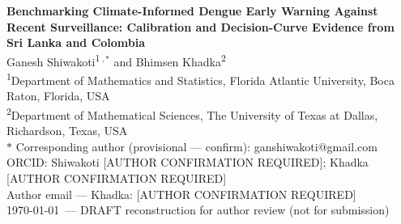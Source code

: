\documentclass[11pt,a4paper]{article}
\begin{document}
\begin{center}
{\Large \textbf{Benchmarking Climate-Informed Dengue Early Warning Against Recent Surveillance: Calibration and Decision-Curve Evidence from Sri Lanka and Colombia}}\\[1.2em]

Ganesh Shiwakoti\textsuperscript{1}\,$^{,\ast}$ and Bhimsen Khadka\textsuperscript{2}\\[0.6em]

\footnotesize
\textsuperscript{1}Department of Mathematics and Statistics, Florida Atlantic University, Boca Raton, Florida, USA\\
\textsuperscript{2}Department of Mathematical Sciences, The University of Texas at Dallas, Richardson, Texas, USA\\[0.4em]
$\ast$ Corresponding author (provisional --- confirm): ganshiwakoti@gmail.com\\
ORCID: Shiwakoti [AUTHOR CONFIRMATION REQUIRED]; Khadka [AUTHOR CONFIRMATION REQUIRED]\\
Author email — Khadka: [AUTHOR CONFIRMATION REQUIRED]\\[0.4em]
\today\ — DRAFT reconstruction for author review (not for submission)
\end{center}

\vspace{0.5em}
\end{document}
